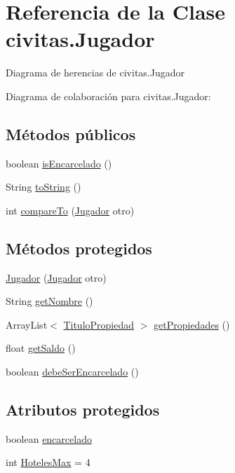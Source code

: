 \hypertarget{classcivitas_1_1Jugador}{}\section{Referencia de la Clase civitas.\+Jugador}
\label{classcivitas_1_1Jugador}


Diagrama de herencias de civitas.\+Jugador


Diagrama de colaboración para civitas.\+Jugador\+:
\subsection*{Métodos públicos}
\begin{DoxyCompactItemize}
\item 
boolean \hyperlink{classcivitas_1_1Jugador_a05547894205ba819363c25f40addecae}{is\+Encarcelado} ()
\item 
String \hyperlink{classcivitas_1_1Jugador_a102b4070dfc271c865fcd6ebe92d9c06}{to\+String} ()
\item 
int \hyperlink{classcivitas_1_1Jugador_ad18fdf2b46d7146b458a77a919d66b58}{compare\+To} (\hyperlink{classcivitas_1_1Jugador}{Jugador} otro)
\end{DoxyCompactItemize}
\subsection*{Métodos protegidos}
\begin{DoxyCompactItemize}
\item 
\hyperlink{classcivitas_1_1Jugador_ab6d7fb12843896b100653b7ad9d9bab8}{Jugador} (\hyperlink{classcivitas_1_1Jugador}{Jugador} otro)
\item 
String \hyperlink{classcivitas_1_1Jugador_a798c1fffaaf1dd8d12f36dd3d09b4f1b}{get\+Nombre} ()
\item 
Array\+List$<$ \hyperlink{classcivitas_1_1TituloPropiedad}{Titulo\+Propiedad} $>$ \hyperlink{classcivitas_1_1Jugador_a2927df4695696abd841c71f6c3eba318}{get\+Propiedades} ()
\item 
float \hyperlink{classcivitas_1_1Jugador_a3c9d02f7974457585c0e2a58ccad6c76}{get\+Saldo} ()
\item 
boolean \hyperlink{classcivitas_1_1Jugador_af79b45017fa40c343ea072a30e9578d4}{debe\+Ser\+Encarcelado} ()
\end{DoxyCompactItemize}
\subsection*{Atributos protegidos}
\begin{DoxyCompactItemize}
\item 
boolean \hyperlink{classcivitas_1_1Jugador_a122f45dd187677cdb7b4367f4a8c8e31}{encarcelado}
\item 
int \hyperlink{classcivitas_1_1Jugador_a58a742df083ab5154311eb24a9f336f7}{Hoteles\+Max} = 4
\end{DoxyCompactItemize}

